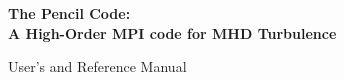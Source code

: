 \documentclass[\mydriver,12pt,twoside,notitlepage,a4paper]{article}
\begin{document}
\pagestyle{empty}
\pagestyle{plain}


\begin{titlepage}
  \begin{center}

  \large

  \vspace*{2cm}

  {\Large\sffamily\bfseries The Pencil Code:\\[2\parskip]
    A High-Order MPI code for MHD Turbulence}

  \vspace{3ex}

  {\sffamily User's and Reference Manual}



\end{center}
\end{titlepage}
\end{document}
